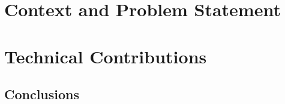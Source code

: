 \documentclass[english]{spimubphdthesis}
\begin{document}
 
\frontmatter




	
\setcounter{tocdepth}{3}
\tableofcontents

\mainmatter

\fontsize{12}{15}
\selectfont
 
\part{Context and Problem Statement}




%

\part{Technical Contributions}






\chapter{Conclusions}
\end{document}
